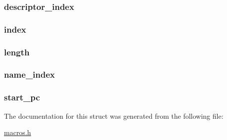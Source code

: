 \subsubsection[{descriptor\+\_\+index}]{ descriptor\+\_\+index}\label{struct_local_variable_for_variable_a3f13794b6c8b4ffc87b87a7c01a69060}
\hypertarget{struct_local_variable_for_variable_a125cab34bc0dc872fa4a0aedbe688365}{}
\subsubsection[{index}]{ index}\label{struct_local_variable_for_variable_a125cab34bc0dc872fa4a0aedbe688365}
\hypertarget{struct_local_variable_for_variable_ad01efb9db3818b64eae5965bf341710f}{}
\subsubsection[{length}]{ length}\label{struct_local_variable_for_variable_ad01efb9db3818b64eae5965bf341710f}
\hypertarget{struct_local_variable_for_variable_ae939ac3ca00f5727beaa02d0e339183d}{}
\subsubsection[{name\+\_\+index}]{ name\+\_\+index}\label{struct_local_variable_for_variable_ae939ac3ca00f5727beaa02d0e339183d}
\hypertarget{struct_local_variable_for_variable_a3ded0b47a89e0816c20dc577a82a1cd5}{}
\subsubsection[{start\+\_\+pc}]{ start\+\_\+pc}\label{struct_local_variable_for_variable_a3ded0b47a89e0816c20dc577a82a1cd5}


The documentation for this struct was generated from the following file\+:\begin{DoxyCompactItemize}
\item 
\hyperlink{macros_8h}{macros.\+h}\end{DoxyCompactItemize}
